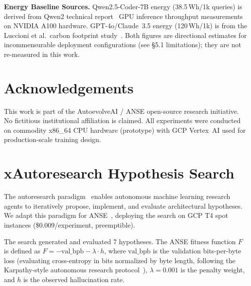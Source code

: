 \documentclass[conference]{IEEEtran}
\begin{document}
\noindent\textbf{Energy Baseline Sources.}
Qwen2.5-Coder-7B energy (38.5\,Wh/1k queries) is derived from Qwen2 technical
report~\cite{qwen2025qwen25} GPU inference throughput measurements on NVIDIA A100 hardware.
GPT-4o/Claude~3.5 energy (120\,Wh/1k) is from the Luccioni et al.\ carbon footprint
study~\cite{luccioni2023power}. Both figures are directional estimates for incommensurable
deployment configurations (see §5.1 limitations); they are not re-measured in this work.

\section*{Acknowledgements}

This work is part of the AutoevolveAI / ANSE open-source research initiative.
No fictitious institutional affiliation is claimed.
All experiments were conducted on commodity x86\_64 CPU hardware (prototype)
with GCP Vertex~AI used for production-scale training design.

\section{xAutoresearch Hypothesis Search}
\label{sec:xautoresearch}

The autoresearch paradigm~\cite{karpathy2026autoresearch} enables autonomous machine learning research agents to iteratively propose, implement, and evaluate architectural hypotheses. We adapt this paradigm for ANSE~\cite{callens2026xautoresearch}, deploying the search on GCP T4 spot instances (\$0.009/experiment, preemptible).

The search generated and evaluated 7 hypotheses. The ANSE fitness function $F$ is defined as $F = -\text{val\_bpb} - \lambda \cdot h$, where $\text{val\_bpb}$ is the validation bits-per-byte loss (evaluating cross-entropy in bits normalized by byte length, following the Karpathy-style autonomous research protocol~\cite{karpathy2026autoresearch}), $\lambda = 0.001$ is the penalty weight, and $h$ is the observed hallucination rate.
\end{document}
